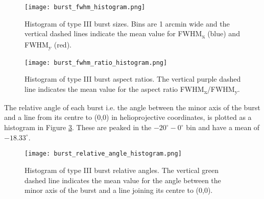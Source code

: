 \begin{figure}[ht]
\centering
\texttt{[image: burst\_fwhm\_histogram.png]}
\caption[Histogram of type III burst sizes.]{Histogram of type III burst sizes. Bins are 1 arcmin wide and the vertical dashed lines indicate the mean value for FWHM\textsubscript{x} (blue) and FWHM\textsubscript{y} (red).}
\label{fig:fwhm_hist}
\end{figure}

\begin{figure}[ht]
\centering
\texttt{[image: burst\_fwhm\_ratio\_histogram.png]}
\caption[Histogram of type III burst aspect ratios.]{Histogram of type III burst aspect ratios. The vertical purple dashed line indicates the mean value for the aspect ratio FWHM\textsubscript{x}/FWHM\textsubscript{y}.}
\label{fig:fwhm_ratio_hist}
\end{figure}

The relative angle of each burst i.e. the angle between the minor axis of the burst and a line from its centre to (0,0) in helioprojective coordinates, is plotted as a histogram in Figure \ref{fig:rel_ang_hist}. These are peaked in the $-20^\circ - 0^\circ$ bin and have a mean of $-18.33^\circ$.

\begin{figure}[ht]
\centering
\texttt{[image: burst\_relative\_angle\_histogram.png]}
\caption[Histogram of type III burst relative angles.]{Histogram of type III burst relative angles. The vertical green dashed line indicates the mean value for the angle between the minor axis of the burst and a line joining its centre to (0,0).}
\label{fig:rel_ang_hist}
\end{figure}

